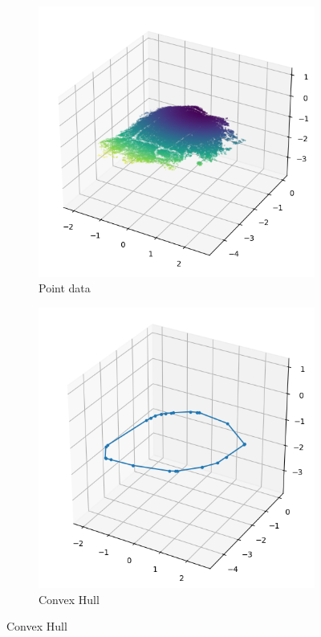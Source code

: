\begin{figure}[ht!]

    \centering
    \begin{subfigure}[b]{0.4\textwidth}
        \centering
        \includegraphics[width=\linewidth]{python/plots/hull/points}
        \caption{Point data}
    \end{subfigure}%
    \begin{subfigure}[b]{0.4\textwidth}
        \centering
        \includegraphics[width=\linewidth]{python/plots/hull/hull}
        \caption{Convex Hull}
    \end{subfigure}%


\end{figure}
